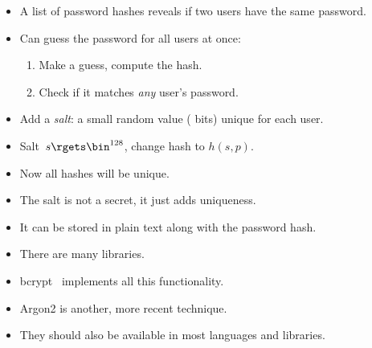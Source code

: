 \begin{frame}
  \begin{remark}
    \begin{itemize}
      \item A list of password hashes reveals if two users have the same 
        password.
      \item Can guess the password for all users at once:
        \begin{enumerate}
          \item Make a guess, compute the hash.
          \item Check if it matches \emph{any} user's password.
        \end{enumerate}
    \end{itemize}
  \end{remark}

  \pause

  \begin{solution}
    \begin{itemize}
      \item Add a \emph{salt}: a small random value ( bits) unique for 
        each user.
      \item Salt~\(s\rgets \bin^{128}\), change hash to \(h(s, p)\).
      \item Now all hashes will be unique.
    \end{itemize}
  \end{solution}
\end{frame}

\begin{frame}
  \begin{remark}
    \begin{itemize}
      \item The salt is not a secret, it just adds uniqueness.
      \item It can be stored in plain text along with the password hash.
    \end{itemize}
  \end{remark}
\end{frame}

\begin{frame}
  \begin{example}
    \begin{itemize}
      \item There are many libraries.
      \item bcrypt~\cite{bcrypt} implements all this functionality.
      \item Argon2 is another, more recent technique.
      \item They should also be available in most languages and libraries.
    \end{itemize}
  \end{example}
\end{frame}




\begin{frame}[allowframebreaks]
	\small
  \printbibliography{}
\end{frame}

